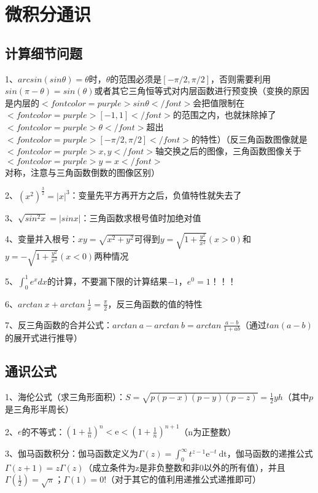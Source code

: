 \chapter{微积分通识}

\section{计算细节问题}

1、$ arcsin(sin\theta)=\theta $时，$ \theta $的范围必须是$ [-\pi/2,\pi/2] $，否则需要利用$ sin(\pi-\theta)=sin(\theta) $或者其它三角恒等式对内层函数进行预变换（变换的原因是内层的$ <font color=purple>sin\theta</font> $会把值限制在$ <font color=purple>[-1,1]</font> $的范围之内，也就抹除掉了$ <font color=purple>\theta</font> $超出$ <font color=purple>[-\pi/2,\pi/2]</font> $的特性）（反三角函数图像就是$ <font color=purple>x,y</font> $轴交换之后的图像，三角函数图像关于$ <font color=purple>y=x</font> $对称，注意与三角函数倒数的图像区别）

2、$ {(x^2)}^{\frac{3}{2}}=|x|^{3} $：变量先平方再开方之后，负值特性就失去了

3、$ \sqrt{sin^2x}=|sinx| $：三角函数求根号值时加绝对值

4、变量并入根号：$ xy=\sqrt{x^2+y^2} $可得到$ y=\sqrt{1+\frac{y^2}{x^2}}(x > 0) $和$ y=-\sqrt{1+\frac{y^2}{x^2}}(x < 0) $两种情况

5、$ \int_{0}^{1} e^x dx $的计算，不要漏下限的计算结果$ -1 $，$ e^0=1 $！！！

6、$ arctan\ x + arctan\ \frac{1}{x}=\frac{\pi}{2} $，反三角函数的值的特性

7、反三角函数的合并公式：$ arctan\ a - arctan\ b=arctan\ \frac{a-b}{1+ab} $（通过$ tan(a-b) $的展开式进行推导）



\section{通识公式}

1、海伦公式（求三角形面积）：$ S=\sqrt{p(p-x)(p-y)(p-z)}=\frac{1}{2} y h $（其中$ p $是三角形半周长）

2、$ e $的不等式：$ \left(1+\frac{1}{n}\right)^{n}<\mathrm{e}<\left(1+\frac{1}{n}\right)^{n+1} $（n为正整数）

3、伽马函数积分：伽马函数定义为$ \Gamma(z)=\int_{0}^{\infty} t^{z-1} \mathrm{e}^{-t} \mathrm{~d} \mathrm{t} $，伽马函数的递推公式$ \Gamma(z+1)=z \Gamma(z) $（成立条件为z是非负整数和非0以外的所有值），并且$ \Gamma\left(\frac{1}{2}\right) =\sqrt{\pi} $；$ \Gamma(1) =0 ! $（对于其它的值利用递推公式递推即可）



